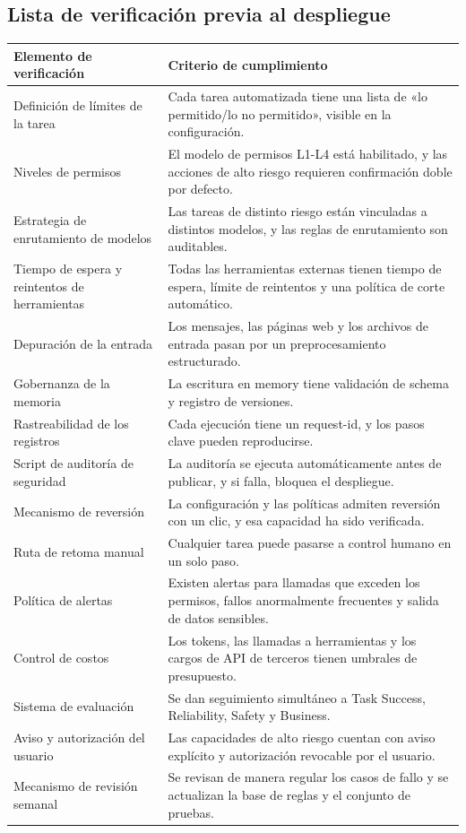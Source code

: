 \subsection{Lista de verificación previa al despliegue}
\begin{longtable}{p{}p{}}
\toprule
\textbf{Elemento de verificación} & \textbf{Criterio de cumplimiento} \\
\midrule
Definición de límites de la tarea & Cada tarea automatizada tiene una lista de «lo permitido/lo no permitido», visible en la configuración. \\
\midrule
Niveles de permisos & El modelo de permisos L1-L4 está habilitado, y las acciones de alto riesgo requieren confirmación doble por defecto. \\
\midrule
Estrategia de enrutamiento de modelos & Las tareas de distinto riesgo están vinculadas a distintos modelos, y las reglas de enrutamiento son auditables. \\
\midrule
Tiempo de espera y reintentos de herramientas & Todas las herramientas externas tienen tiempo de espera, límite de reintentos y una política de corte automático. \\
\midrule
Depuración de la entrada & Los mensajes, las páginas web y los archivos de entrada pasan por un preprocesamiento estructurado. \\
\midrule
Gobernanza de la memoria & La escritura en memory tiene validación de schema y registro de versiones. \\
\midrule
Rastreabilidad de los registros & Cada ejecución tiene un request-id, y los pasos clave pueden reproducirse. \\
\midrule
Script de auditoría de seguridad & La auditoría se ejecuta automáticamente antes de publicar, y si falla, bloquea el despliegue. \\
\midrule
Mecanismo de reversión & La configuración y las políticas admiten reversión con un clic, y esa capacidad ha sido verificada. \\
\midrule
Ruta de retoma manual & Cualquier tarea puede pasarse a control humano en un solo paso. \\
\midrule
Política de alertas & Existen alertas para llamadas que exceden los permisos, fallos anormalmente frecuentes y salida de datos sensibles. \\
\midrule
Control de costos & Los tokens, las llamadas a herramientas y los cargos de API de terceros tienen umbrales de presupuesto. \\
\midrule
Sistema de evaluación & Se dan seguimiento simultáneo a Task Success, Reliability, Safety y Business. \\
\midrule
Aviso y autorización del usuario & Las capacidades de alto riesgo cuentan con aviso explícito y autorización revocable por el usuario. \\
\midrule
Mecanismo de revisión semanal & Se revisan de manera regular los casos de fallo y se actualizan la base de reglas y el conjunto de pruebas. \\
\bottomrule
\end{longtable}

